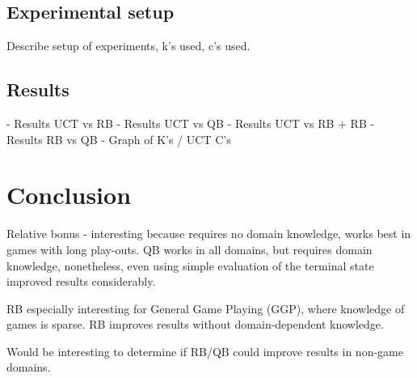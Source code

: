 \documentclass{ecai2010}
\begin{document}
\subsection{Experimental setup}
Describe setup of experiments, k's used, c's used.

\subsection{Results}
- Results UCT vs RB
- Results UCT vs QB
- Results UCT vs RB + RB
- Results RB vs QB
- Graph of K's / UCT C's

\section{Conclusion}
Relative bonus - interesting because requires no domain knowledge, works best in games with long play-outs.
QB works in all domains, but requires domain knowledge, nonetheless, even using simple evaluation of the terminal state improved results considerably.

RB especially interesting for General Game Playing (GGP), where knowledge of games is sparse. RB improves results without domain-dependent knowledge.

Would be interesting to determine if RB/QB could improve results in non-game domains.


\end{document}
